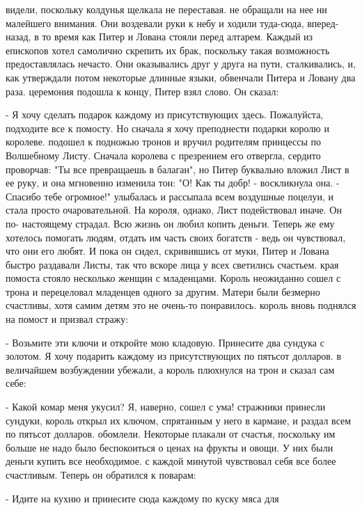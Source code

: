 видели, поскольку колдунья щелкала не переставая.
 не обращали на нее ни малейшего внимания. Они воздевали 
руки к небу и ходили туда-сюда, вперед-назад, в то время как Питер и 
Лована стояли перед алтарем. Каждый из епископов хотел самолично 
скрепить их брак, поскольку такая возможность предоставлялась нечасто. 
Они оказывались друг у друга на пути, сталкивались, и, как утверждали 
потом некоторые длинные языки, обвенчали Питера и Ловану два раза.
 церемония подошла к концу, Питер взял слово. Он сказал:
\par- Я хочу сделать подарок каждому из присутствующих здесь. 
Пожалуйста, подходите все к помосту. Но сначала я хочу преподнести 
подарки королю и королеве.
 подошел к подножью тронов и вручил родителям принцессы по 
Волшебному Листу. Сначала королева с презрением его отвергла, сердито 
проворчав: "Ты все превращаешь в балаган", но Питер буквально вложил 
Лист в ее руку, и она мгновенно изменила тон: "О! Как ты добр! - 
воскликнула она. - Спасибо тебе огромное!"
 улыбалась и рассыпала всем воздушные поцелуи, и стала просто 
очаровательной. На короля, однако, Лист подействовал иначе. Он по-
настоящему страдал. Всю жизнь он любил копить деньги. Теперь же ему 
хотелось помогать людям, отдать им часть своих богатств - ведь он 
чувствовал, что они его любят. И пока он сидел, скривившись от муки, 
Питер и Лована быстро раздавали Листы, так что вскоре лица у всех 
светились счастьем.
 края помоста стояло несколько женщин с младенцами. Король 
неожиданно сошел с трона и перецеловал младенцев одного за другим. 
Матери были безмерно счастливы, хотя самим детям это не очень-то 
понравилось.
 король вновь поднялся на помост и призвал стражу:
\par- Возьмите эти ключи и откройте мою кладовую. Принесите два 
сундука с золотом. Я хочу подарить каждому из присутствующих по 
пятьсот долларов.
 в величайшем возбуждении убежали, а король плюхнулся на 
трон и сказал сам себе:
\par- Какой комар меня укусил? Я, наверно, сошел с ума!
 стражники принесли сундуки, король открыл их ключом, 
спрятанным у него в кармане, и раздал всем по пятьсот долларов.
 обомлели. Некоторые плакали от счастья, поскольку им 
больше не надо было беспокоиться о ценах на фрукты и овощи. У них были 
деньги купить все необходимое.
 с каждой минутой чувствовал себя все более счастливым. 
Теперь он обратился к поварам:
\par- Идите на кухню и принесите сюда каждому по куску мяса для 
